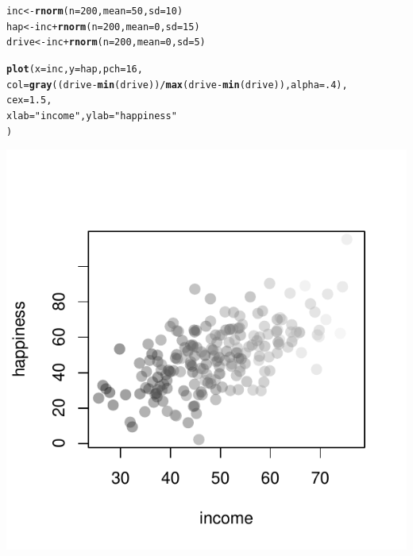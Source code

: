 \documentclass{tufte-book}\usepackage[]{graphicx}\usepackage[]{color}
\makeatletter
\def\maxwidth{ %
  \ifdim\Gin@nat@width>\linewidth
    \linewidth
  \else
    \Gin@nat@width
  \fi
}
\newcommand{\hlnum}[1]{\textcolor[rgb]{0.686,0.059,0.569}{#1}}%
\newcommand{\hlstr}[1]{\textcolor[rgb]{0.192,0.494,0.8}{#1}}%
\newcommand{\hlopt}[1]{\textcolor[rgb]{0,0,0}{#1}}%
\newcommand{\hlstd}[1]{\textcolor[rgb]{0.345,0.345,0.345}{#1}}%
\newcommand{\hlkwb}[1]{\textcolor[rgb]{0.69,0.353,0.396}{#1}}%
\newcommand{\hlkwc}[1]{\textcolor[rgb]{0.333,0.667,0.333}{#1}}%
\newcommand{\hlkwd}[1]{\textcolor[rgb]{0.737,0.353,0.396}{\textbf{#1}}}%
\newenvironment{kframe}{%
 \def\at@end@of@kframe{}%
 \ifinner\ifhmode%
  \def\at@end@of@kframe{\end{minipage}}%
  \begin{minipage}{\columnwidth}%
 \fi\fi%
 \def\FrameCommand##1{\hskip\@totalleftmargin \hskip-\fboxsep
 \colorbox{shadecolor}{##1}\hskip-\fboxsep
     \hskip-\linewidth \hskip-\@totalleftmargin \hskip\columnwidth}%
 \MakeFramed {\advance\hsize-\width
   \@totalleftmargin\z@ \linewidth\hsize
   \@setminipage}}%
 {\par\unskip\endMakeFramed%
 \at@end@of@kframe}
\newenvironment{knitrout}{}{} %
\makeatother
\begin{document}
\begin{footnotesize}
\begin{marginfigure}
\begin{tiny}
\begin{knitrout}
\color{fgcolor}\begin{kframe}
\begin{alltt}
\hlstd{inc} \hlkwb{<-} \hlkwd{rnorm}\hlstd{(}\hlkwc{n} \hlstd{=} \hlnum{200}\hlstd{,} \hlkwc{mean} \hlstd{=} \hlnum{50}\hlstd{,} \hlkwc{sd} \hlstd{=} \hlnum{10}\hlstd{)}
\hlstd{hap} \hlkwb{<-} \hlstd{inc} \hlopt{+} \hlkwd{rnorm}\hlstd{(}\hlkwc{n} \hlstd{=} \hlnum{200}\hlstd{,} \hlkwc{mean} \hlstd{=} \hlnum{0}\hlstd{,} \hlkwc{sd} \hlstd{=} \hlnum{15}\hlstd{)}
\hlstd{drive} \hlkwb{<-} \hlstd{inc} \hlopt{+} \hlkwd{rnorm}\hlstd{(}\hlkwc{n} \hlstd{=} \hlnum{200}\hlstd{,} \hlkwc{mean} \hlstd{=} \hlnum{0}\hlstd{,} \hlkwc{sd} \hlstd{=} \hlnum{5}\hlstd{)}

\hlkwd{plot}\hlstd{(}\hlkwc{x} \hlstd{= inc,} \hlkwc{y} \hlstd{= hap,} \hlkwc{pch} \hlstd{=} \hlnum{16}\hlstd{,}
     \hlkwc{col} \hlstd{=} \hlkwd{gray}\hlstd{((drive} \hlopt{-} \hlkwd{min}\hlstd{(drive))} \hlopt{/} \hlkwd{max}\hlstd{(drive} \hlopt{-} \hlkwd{min}\hlstd{(drive)),} \hlkwc{alpha} \hlstd{=} \hlnum{.4}\hlstd{),}
     \hlkwc{cex} \hlstd{=} \hlnum{1.5}\hlstd{,}
     \hlkwc{xlab} \hlstd{=} \hlstr{"income"}\hlstd{,} \hlkwc{ylab} \hlstd{=} \hlstr{"happiness"}
     \hlstd{)}
\end{alltt}
\end{kframe}
\includegraphics[width=\maxwidth]{figure/unnamed-chunk-168-1} 


\end{knitrout}
\end{tiny}
\end{marginfigure}
\end{footnotesize}
\end{document}
